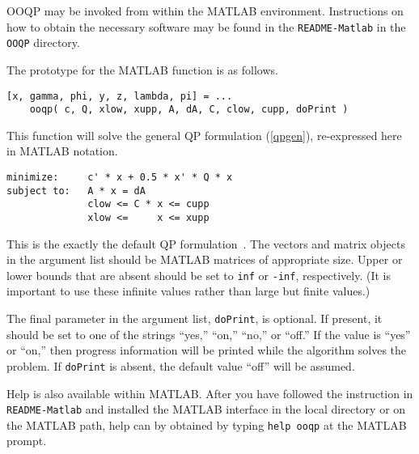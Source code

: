 OOQP may be invoked from within the MATLAB environment. Instructions
on how to obtain the necessary software may be found in the
\texttt{README-Matlab} in the {\tt OOQP} directory.

The prototype for the MATLAB function is as follows.
\begin{verbatim}
[x, gamma, phi, y, z, lambda, pi] = ...
    ooqp( c, Q, xlow, xupp, A, dA, C, clow, cupp, doPrint )
\end{verbatim}
This function will solve the general QP formulation (\ref{qpgen}),
re-expressed here in MATLAB notation.
\begin{verbatim}
minimize:     c' * x + 0.5 * x' * Q * x
subject to:   A * x = dA
              clow <= C * x <= cupp
              xlow <=     x <= xupp
\end{verbatim}
This is the exactly the default QP formulation~. The
vectors and matrix objects in the argument list should be MATLAB
matrices of appropriate size.  Upper or lower bounds that are absent
should be set to \texttt{inf} or \texttt{-inf}, respectively. (It is
important to use these infinite values rather than large but finite
values.)

The final parameter in the argument list, \texttt{doPrint}, is
optional. If present, it should be set to one of the strings ``yes,''
``on,'' ``no,'' or ``off.'' If the value is ``yes'' or ``on,'' then
progress information will be printed while the algorithm solves the
problem. If \texttt{doPrint} is absent, the default value ``off'' will
be assumed.

Help is also available within MATLAB. After you have followed the
instruction in \texttt{README-Matlab} and installed the MATLAB
interface in the local directory or on the MATLAB path, help can by
obtained by typing \texttt{help ooqp} at the MATLAB prompt.

